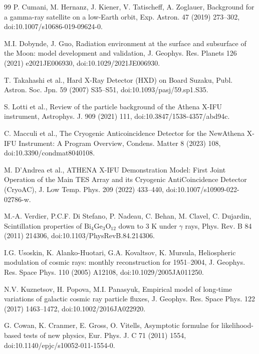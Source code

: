 \documentclass[11pt]{article}
\newcommand{\revblue}[1]{\textcolor{revisionblue}{#1}}
\begin{document}
\begin{thebibliography}{99}
P. Cumani, M. Hernanz, J. Kiener, V. Tatischeff, A. Zoglauer,
Background for a gamma-ray satellite on a low-Earth orbit,
Exp. Astron. 47 (2019) 273--302,
doi:10.1007/s10686-019-09624-0.

M.I. Dobynde, J. Guo,
Radiation environment at the surface and subsurface of the Moon:
model development and validation,
J. Geophys. Res. Planets 126 (2021) e2021JE006930,
doi:10.1029/2021JE006930.

\revblue{T. Takahashi et al., Hard X-Ray Detector (HXD) on Board Suzaku,
Publ. Astron. Soc. Jpn. 59 (2007) S35--S51,
doi:10.1093/pasj/59.sp1.S35.}

S. Lotti et al.,
Review of the particle background of the Athena X-IFU instrument,
Astrophys. J. 909 (2021) 111,
doi:10.3847/1538-4357/abd94c.

\revblue{C. Macculi et al.,
The Cryogenic Anticoincidence Detector for the NewAthena X-IFU Instrument:
A Program Overview,
Condens. Matter 8 (2023) 108,
doi:10.3390/condmat8040108.}

\revblue{M. D'Andrea et al.,
ATHENA X-IFU Demonstration Model: First Joint Operation of the Main TES Array
and its Cryogenic AntiCoincidence Detector (CryoAC),
J. Low Temp. Phys. 209 (2022) 433--440,
doi:10.1007/s10909-022-02786-w.}

\revblue{M.-A. Verdier, P.C.F. Di Stefano, P. Nadeau, C. Behan, M. Clavel, C. Dujardin,
Scintillation properties of $\mathrm{Bi_4Ge_3O_{12}}$ down to 3 K under
$\gamma$ rays,
Phys. Rev. B 84 (2011) 214306,
doi:10.1103/PhysRevB.84.214306.}

I.G. Usoskin, K. Alanko-Huotari, G.A. Kovaltsov, K. Mursula,
Heliospheric modulation of cosmic rays: monthly reconstruction for 1951--2004,
J. Geophys. Res. Space Phys. 110 (2005) A12108,
doi:10.1029/2005JA011250.

N.V. Kuznetsov, H. Popova, M.I. Panasyuk,
Empirical model of long-time variations of galactic cosmic ray particle fluxes,
J. Geophys. Res. Space Phys. 122 (2017) 1463--1472,
doi:10.1002/2016JA022920.

G. Cowan, K. Cranmer, E. Gross, O. Vitells, Asymptotic formulae for likelihood-based tests of new physics, Eur. Phys. J. C 71 (2011) 1554, doi:10.1140/epjc/s10052-011-1554-0.

\end{thebibliography}
\end{document}
